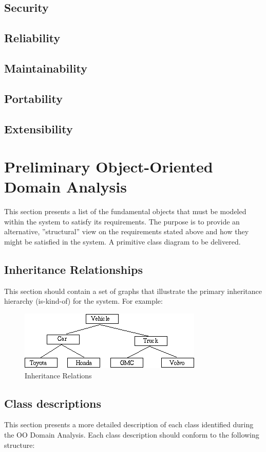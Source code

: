 \documentclass[]{article}
\begin{document}
\subsection {Security}
\subsection {Reliability}
\subsection {Maintainability}
\subsection {Portability}
\subsection {Extensibility}

\section{Preliminary Object-Oriented Domain Analysis}
This section presents a list of the fundamental objects that must be modeled within the system to satisfy its requirements. The purpose is to provide an alternative, ''structural'' view on the requirements stated above and how they might be satisfied in the system. A primitive class diagram to be delivered.

\subsection{Inheritance Relationships}
This section should contain a set of graphs that illustrate the primary inheritance hierarchy (is-kind-of) for the system. For example: 

\begin{figure}[tbh]
\centering
\includegraphics[width=0.7\linewidth]{./image}
\caption{Inheritance Relations}
\label{fig:image}
\end{figure}

\subsection{Class descriptions}
This section presents a more detailed description of each class identified during the OO Domain Analysis.
Each class description should conform to the following structure: 
\end{document}
